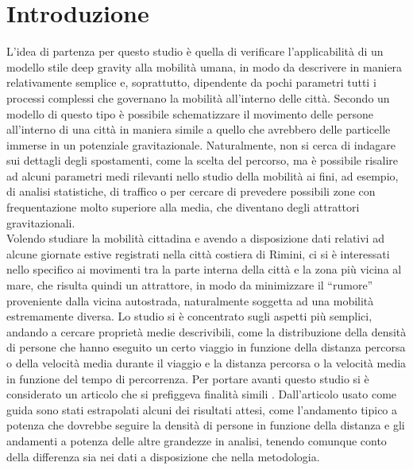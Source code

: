 \documentclass[12pt,a4paper]{article}
\begin{document}
\section{Introduzione}
L'idea di partenza per questo studio è quella di verificare l'applicabilità di un modello stile deep gravity alla mobilità umana, in modo da descrivere in maniera relativamente semplice e, soprattutto, dipendente da pochi parametri tutti i processi complessi che governano la mobilità all'interno delle città.
Secondo un modello di questo tipo è possibile schematizzare il movimento delle persone all'interno di una città in maniera simile a quello che avrebbero delle particelle immerse in un potenziale gravitazionale.
Naturalmente, non si cerca di indagare sui dettagli degli spostamenti, come la scelta del percorso, ma è possibile risalire ad alcuni parametri medi rilevanti nello studio della mobilità ai fini, ad esempio, di analisi statistiche, di traffico o per cercare di prevedere possibili zone con frequentazione molto superiore alla media, che diventano degli attrattori gravitazionali. \\
Volendo studiare la mobilità cittadina e avendo a disposizione dati relativi ad alcune giornate estive registrati nella città costiera di Rimini, ci si è interessati nello specifico ai movimenti tra la parte interna della città e la zona più vicina al mare, che risulta quindi un attrattore, in modo da minimizzare il ``rumore'' proveniente dalla vicina autostrada, naturalmente soggetta ad una mobilità estremamente diversa.
Lo studio si è concentrato sugli aspetti più semplici, andando a cercare proprietà medie descrivibili, come la distribuzione della densità di persone che hanno eseguito un certo viaggio in funzione della distanza percorsa o della velocità media durante il viaggio e la distanza percorsa o la velocità media in funzione del tempo di percorrenza.
Per portare avanti questo studio si è considerato un articolo che si prefiggeva finalità simili \cite{Mobility}.
Dall'articolo usato come guida sono stati estrapolati alcuni dei risultati attesi, come l'andamento tipico a potenza che dovrebbe seguire la densità di persone in funzione della distanza e gli andamenti a potenza delle altre grandezze in analisi, tenendo comunque conto della differenza sia nei dati a disposizione che nella metodologia.
\end{document}
